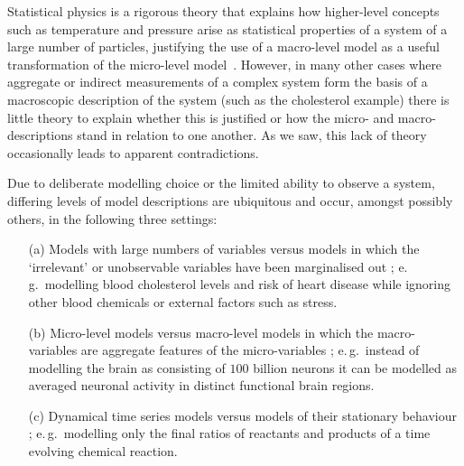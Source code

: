 Statistical physics is a rigorous theory that explains how higher-level concepts such as temperature and pressure arise as statistical properties of a system of a large number of particles, justifying the use of a macro-level model as a useful transformation of the micro-level model~\citep{Balian}.
However, in many other cases where aggregate or indirect measurements of a complex system form the basis of a macroscopic description of the system (such as the cholesterol example) there is little theory to explain whether this is justified or how the micro- and macro-descriptions stand in relation to one another.
As we saw, this lack of theory occasionally leads to apparent contradictions.

Due to deliberate modelling choice or the limited ability to observe a system, differing levels of model descriptions are ubiquitous and occur, amongst possibly others, in the following three settings:

\begin{itemize}[noitemsep]
	\item[(a)] Models with large numbers of variables versus models in which the `irrelevant' or unobservable variables have been marginalised out \citep{bongers2016structural}; e.\,g.\ modelling blood cholesterol levels and risk of heart disease while ignoring other blood chemicals or external factors such as stress.
	
	\item[(b)] Micro-level models versus macro-level models in which the macro-variables are aggregate features of the micro-variables \citep{simon1961aggregation,iwasaki1994causality,hoel2013quantifying,chalupka2015visual,chalupka2016multi}; e.\,g.\ instead of modelling the brain as consisting of $100$ billion neurons it can be modelled as averaged neuronal activity in distinct functional brain regions.
	
	\item[(c)] Dynamical time series models versus models of their stationary behaviour \citep{fisher1970correspondence,iwasaki1994causality,dash2001caveats,lacerda2012discovering,mooij2013ode,mooij2013cyclic}; e.\,g.\ modelling only the final ratios of reactants and products of a time evolving chemical reaction.
\end{itemize}

